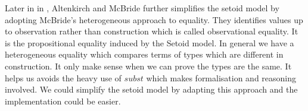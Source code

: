 
Later in in \cite{alti:ott-conf}, Altenkirch and McBride further
simplifies the setoid model by adopting McBride's heterogeneous
approach to equality. They identifies values up to observation rather than
  construction which is called observational equality. It is the
  propositional equality induced by the Setoid model.  In general we have a heterogeneous equality which
  compares terms of types which are different in construction. It only
  make sense when we can prove the types are the same. It helps us
  avoids the heavy use of $subst$ which makes formalisation and
  reasoning involved. We could simplify the setoid model by adapting this
  approach and the implementation could be easier.
